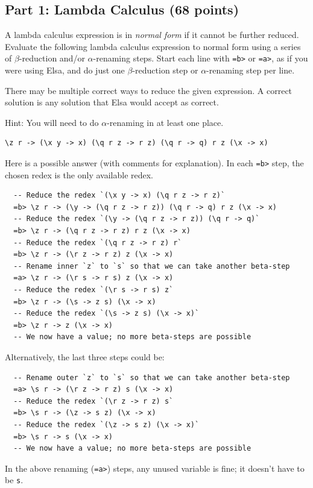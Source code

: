 \documentclass[addpoints,answers]{exam}
\begin{document}
\subsection*{\textbf{Part 1: Lambda Calculus (68 points)}}

\begin{questions}

\question[6] A lambda calculus expression is in \emph{normal form} if it cannot be further reduced.  Evaluate the following lambda calculus expression to normal form using a series of $\beta$-reduction and/or $\alpha$-renaming steps.  Start each line with \texttt{=b>} or \texttt{=a>}, as if you were using Elsa, and do just one $\beta$-reduction step or $\alpha$-renaming step per line.

There may be multiple correct ways to reduce the given expression.  A correct solution is any solution that Elsa would accept as correct.

Hint: You will need to do $\alpha$-renaming in at least one place.

\begin{verbatim}
\z r -> (\x y -> x) (\q r z -> r z) (\q r -> q) r z (\x -> x)
\end{verbatim}
\begin{solutionorbox}[\stretch{1}]
Here is a possible answer (with comments for explanation). In each \verb|=b>| step, the chosen redex is the only available redex.  
\begin{verbatim}
  -- Reduce the redex `(\x y -> x) (\q r z -> r z)`
  =b> \z r -> (\y -> (\q r z -> r z)) (\q r -> q) r z (\x -> x)
  -- Reduce the redex `(\y -> (\q r z -> r z)) (\q r -> q)`
  =b> \z r -> (\q r z -> r z) r z (\x -> x)
  -- Reduce the redex `(\q r z -> r z) r`
  =b> \z r -> (\r z -> r z) z (\x -> x)
  -- Rename inner `z` to `s` so that we can take another beta-step
  =a> \z r -> (\r s -> r s) z (\x -> x)
  -- Reduce the redex `(\r s -> r s) z`
  =b> \z r -> (\s -> z s) (\x -> x)
  -- Reduce the redex `(\s -> z s) (\x -> x)`
  =b> \z r -> z (\x -> x)
  -- We now have a value; no more beta-steps are possible
\end{verbatim}
Alternatively, the last three steps could be:
\begin{verbatim}
  -- Rename outer `z` to `s` so that we can take another beta-step
  =a> \s r -> (\r z -> r z) s (\x -> x)
  -- Reduce the redex `(\r z -> r z) s`
  =b> \s r -> (\z -> s z) (\x -> x)
  -- Reduce the redex `(\z -> s z) (\x -> x)`
  =b> \s r -> s (\x -> x)
  -- We now have a value; no more beta-steps are possible
\end{verbatim}
In the above renaming (\verb|=a>|) steps, any unused variable is fine; it doesn’t have to be \verb|s|.


\end{solutionorbox}
\end{questions}
\end{document}
